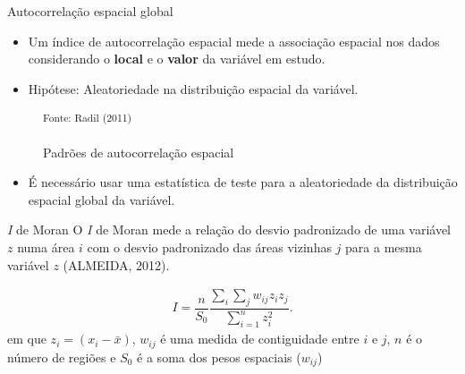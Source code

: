 \documentclass[aspectratio=169]{beamer}
\begin{document}
\begin{frame}{Autocorrelação espacial global}
	\begin{itemize}
		\item Um índice de autocorrelação espacial mede a associação espacial nos dados considerando o \textbf{local} e o \textbf{valor} da variável em estudo.
		\item Hipótese: Aleatoriedade na distribuição espacial da variável. 
	\end{itemize}
	
	\begin{figure}
		\centering
		\small
		\hspace{0.2cm}
		\hspace{0.2cm}
		\caption{Padrões de autocorrelação espacial}
		\small \textsuperscript {Fonte: Radil (2011)}
		\label{fig:1}
	\end{figure}
	\begin{itemize}
		\item É necessário usar uma estatística de teste para a aleatoriedade da distribuição espacial global da variável.
	\end{itemize}
\end{frame}

\begin{frame}{\textit{I} de Moran}
	O \textit{I} de Moran mede a relação do desvio padronizado de uma variável $z$ numa área $i$ com o desvio padronizado das 	áreas vizinhas $j$ para a mesma variável $z$ (ALMEIDA, 2012).
	
	\begin{block}{}
		\small
		\begin{align}
		\label{IMoran}
		I = \dfrac{n}{S_0} \dfrac{\displaystyle\sum_{i} \sum_{j} w_{ij} z_i z_j}{\displaystyle\sum_{i=1}^{n} z_i^2}.
		\end{align}
		\noindent \small em que $z_i = (x_i - \bar{x})$, $w_{ij}$ é uma medida de contiguidade entre $i$ e $j$,  $n$ é o número de regiões e $S_0$ é a soma dos pesos espaciais ($w_{ij}$)
	\end{block}	
\end{frame}
\end{document}

